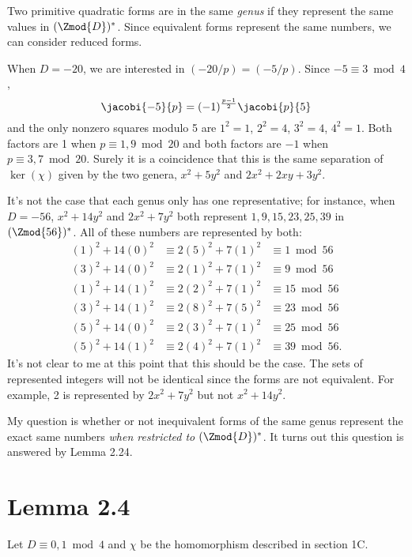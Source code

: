 Two primitive quadratic forms are in the same \emph{genus} if they represent the same values in $(\Zmod{D})^*$. Since equivalent forms represent the same numbers, we can consider reduced forms.

When $D=-20$, we are interested in $(-20/p) = (-5/p)$. Since $-5\equiv 3\bmod 4$,
\[\jacobi{-5}{p}=(-1)^\frac{p-1}{2}\jacobi{p}{5}\]
and the only nonzero squares modulo 5 are $1^2=1$, $2^2=4$, $3^2=4$, $4^2=1$. Both factors are 1 when $p\equiv 1, 9\bmod 20$ and both factors are $-1$ when $p\equiv 3, 7\bmod 20$. Surely it is a coincidence that this is the same separation of $\ker(\chi)$ given by the two genera, $x^2+5y^2$ and $2x^2+2xy+3y^2$.

It's not the case that each genus only has one representative; for instance, when $D=-56$, $x^2+14y^2$ and $2x^2+7y^2$ both represent $1, 9, 15, 23, 25, 39$ in $(\Zmod{56})^*$. All of these numbers are represented by both:
\begin{align*}
(1)^2 + 14(0)^2 &\equiv 2(5)^2+7(1)^2 &\equiv 1\bmod 56\\
(3)^2 + 14(0)^2 &\equiv 2(1)^2+7(1)^2 &\equiv 9\bmod 56\\
(1)^2 + 14(1)^2 &\equiv 2(2)^2+7(1)^2 &\equiv 15\bmod 56\\
(3)^2 + 14(1)^2 &\equiv 2(8)^2+7(5)^2 &\equiv 23\bmod 56\\
(5)^2 + 14(0)^2 &\equiv 2(3)^2+7(1)^2 &\equiv 25\bmod 56\\
(5)^2 + 14(1)^2 &\equiv 2(4)^2+7(1)^2 &\equiv 39\bmod 56.
\end{align*}
It's not clear to me at this point that this should be the case. The sets of represented integers will not be identical since the forms are not equivalent. For example, 2 is represented by $2x^2+7y^2$ but not $x^2+14y^2$.

My question is whether or not inequivalent forms of the same genus represent the exact same numbers \emph{when restricted to $(\Zmod{D})^*$}. It turns out this question is answered by Lemma 2.24.

\section{Lemma 2.4}

Let $D\equiv 0,1\bmod 4$ and $\chi$ be the homomorphism described in section 1C.

